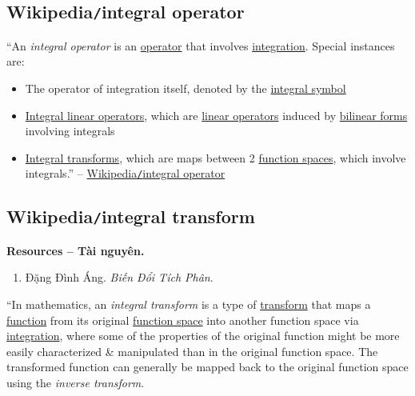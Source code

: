 \documentclass{article}
\begin{document}

\subsection{Wikipedia{\tt/}integral operator}
``An {\it integral operator} is an \href{https://en.wikipedia.org/wiki/Operator_(mathematics)}{operator} that involves \href{https://en.wikipedia.org/wiki/Integral}{integration}. Special instances are:
\begin{itemize}
	\item The operator of integration itself, denoted by the \href{https://en.wikipedia.org/wiki/Integral_symbol}{integral symbol}
	\item \href{https://en.wikipedia.org/wiki/Integral_linear_operator}{Integral linear operators}, which are \href{https://en.wikipedia.org/wiki/Linear_operator}{linear operators} induced by \href{https://en.wikipedia.org/wiki/Bilinear_form}{bilinear forms} involving integrals
	\item \href{https://en.wikipedia.org/wiki/Integral_transform}{Integral transforms}, which are maps between 2 \href{https://en.wikipedia.org/wiki/Function_space}{function spaces}, which involve integrals.'' -- \href{https://en.wikipedia.org/wiki/Integral_operator}{Wikipedia{\tt/}integral operator}
\end{itemize}


\subsection{Wikipedia{\tt/}integral transform}
\textbf{\textsf{Resources -- Tài nguyên.}}
\begin{enumerate}
	\item {\sc Đặng Đình Áng}. {\it Biến Đổi Tích Phân}.
\end{enumerate}
``In mathematics, an {\it integral transform} is a type of \href{https://en.wikipedia.org/wiki/Transform_(mathematics)}{transform} that maps a \href{https://en.wikipedia.org/wiki/Function_(mathematics)}{function} from its original \href{https://en.wikipedia.org/wiki/Function_space}{function space} into another function space via \href{https://en.wikipedia.org/wiki/Integral}{integration}, where some of the properties of the original function might be more easily characterized \& manipulated than in the original function space. The transformed function can generally be mapped back to the original function space using the {\it inverse transform}.
\end{document}
